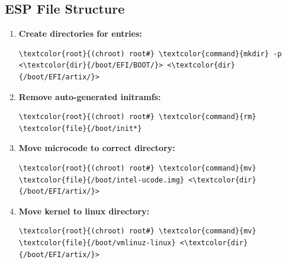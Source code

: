 \documentclass[10pt, a4paper, onecolumn, oneside, titlepage, openany]{book}
\begin{document}
\subsection{ESP File Structure}
\begin{enumerate}
    \item \textbf{Create directories for entries:}
\begin{Verbatim}[commandchars=\\\{\}]
\textcolor{root}{(chroot) root#} \textcolor{command}{mkdir} -p <\textcolor{dir}{/boot/EFI/BOOT/}> <\textcolor{dir}{/boot/EFI/artix/}>
\end{Verbatim}
    \item \textbf{Remove auto-generated initramfs:}
\begin{Verbatim}[commandchars=\\\{\}]
\textcolor{root}{(chroot) root#} \textcolor{command}{rm} \textcolor{file}{/boot/init*}
\end{Verbatim}
    \item \textbf{Move microcode to correct directory:}
\begin{Verbatim}[commandchars=\\\{\}]
\textcolor{root}{(chroot) root#} \textcolor{command}{mv} \textcolor{file}{/boot/intel-ucode.img} <\textcolor{dir}{/boot/EFI/artix/}>
\end{Verbatim}
    \item \textbf{Move kernel to linux directory:}
\begin{Verbatim}[commandchars=\\\{\}]
\textcolor{root}{(chroot) root#} \textcolor{command}{mv} \textcolor{file}{/boot/vmlinuz-linux} <\textcolor{dir}{/boot/EFI/artix/}>
\end{Verbatim}
\end{enumerate}
\end{document}
